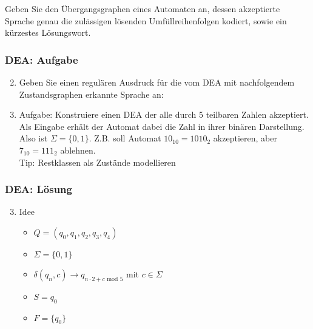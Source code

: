 \documentclass{beamer}
\begin{document}
{\begin{frame}
\begin{enumerate}
		Geben Sie den Übergangsgraphen eines Automaten an, dessen
		akzeptierte Sprache genau die zulässigen lösenden
		Umfüllreihenfolgen kodiert, sowie ein kürzestes Lösungswort.
	\end{enumerate}
\end{frame}
\begin{frame}
\frametitle{DEA: Aufgabe}
\begin{enumerate}
\setcounter{enumi}{1}
\item Geben Sie einen regulären Ausdruck für die vom DEA mit nachfolgendem Zustandsgraphen erkannte Sprache an:
\begin{center}
\end{center}
\end{enumerate}
\end{frame}
\begin{frame}
	\begin{enumerate}
	\setcounter{enumi}{2}
	\item Aufgabe: Konstruiere einen DEA der alle durch 5 teilbaren Zahlen akzeptiert. Als Eingabe erhält der Automat dabei die Zahl in ihrer binären Darstellung. Also ist $\Sigma = \{0, 1\}$. Z.B. soll Automat $10_{10} = 1010_{2}$ akzeptieren, aber $7_{10} = 111_{2}$ ablehnen.
	\pause \\[10pt]
	Tip: Restklassen als Zustände modellieren
	\end{enumerate}
\end{frame}
\begin{frame}
	\frametitle{DEA: Lösung}
	\begin{enumerate}
	\setcounter{enumi}{2}
	\item Idee
		\begin{itemize}
		\item $Q = (q_0, q_1, q_2, q_3, q_4)$\\
		\item $\Sigma = \{0,1\}$
		\item $\delta(q_n, c) \rightarrow q_{n \cdot 2 + c\mbox{ mod }5}$ mit $c\in\Sigma$\\
		\item $S = q_0$\\
		\item $F = \{q_0\}$
		\end{itemize}
	\end{enumerate}
\end{frame}
}
\end{document}
